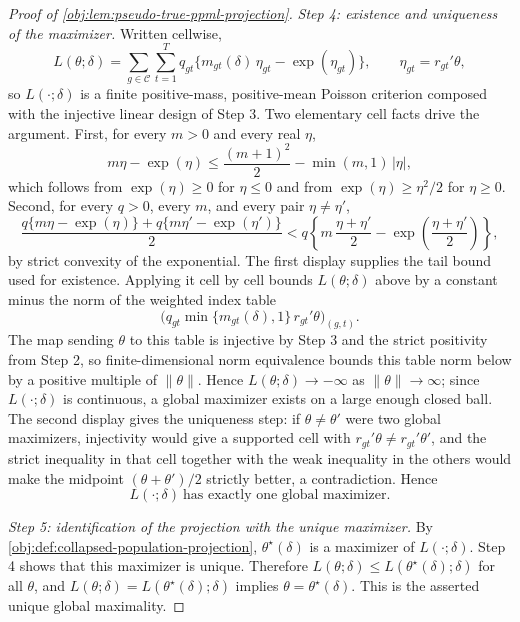 \begin{proof}[Proof of \cref{obj:lem:pseudo-true-ppml-projection}]
\textit{Step 4: existence and uniqueness of the maximizer.} Written cellwise,
\[
L(\theta;\delta)
=
\sum_{g\in\mathcal C}\sum_{t=1}^T
q_{gt}\bigl\{m_{gt}(\delta)\,\eta_{gt}-\exp(\eta_{gt})\bigr\},
\qquad
\eta_{gt}=r_{gt}'\theta ,
\]
so \(L(\cdot;\delta)\) is a finite positive-mass, positive-mean Poisson criterion composed with the injective linear design of Step 3.
Two elementary cell facts drive the argument. First, for every \(m>0\) and every real \(\eta\),
\[
m\eta-\exp(\eta)
\le
\frac{(m+1)^2}{2}-\min(m,1)\,|\eta| ,
\]
which follows from \(\exp(\eta)\ge0\) for \(\eta\le0\) and from \(\exp(\eta)\ge \eta^2/2\) for \(\eta\ge0\).
Second, for every \(q>0\), every \(m\), and every pair \(\eta\neq\eta'\),
\[
\frac{q\{m\eta-\exp(\eta)\}+q\{m\eta'-\exp(\eta')\}}{2}
<
q\left\{m\,\frac{\eta+\eta'}{2}-\exp\!\left(\frac{\eta+\eta'}{2}\right)\right\},
\]
by strict convexity of the exponential.
The first display supplies the tail bound used for existence. Applying it cell by cell bounds \(L(\theta;\delta)\) above by a constant minus the norm of the weighted index table
\[
\bigl(q_{gt}\min\{m_{gt}(\delta),1\}\,r_{gt}'\theta\bigr)_{(g,t)}.
\]
The map sending \(\theta\) to this table is injective by Step 3 and the strict positivity from Step 2, so finite-dimensional norm equivalence bounds this table norm below by a positive multiple of \(\|\theta\|\). Hence \(L(\theta;\delta)\to-\infty\) as \(\|\theta\|\to\infty\); since \(L(\cdot;\delta)\) is continuous, a global maximizer exists on a large enough closed ball. The second display gives the uniqueness step: if \(\theta\neq\theta'\) were two global maximizers, injectivity would give a supported cell with \(r_{gt}'\theta\neq r_{gt}'\theta'\), and the strict inequality in that cell together with the weak inequality in the others would make the midpoint \((\theta+\theta')/2\) strictly better, a contradiction. Hence
\[
L(\cdot;\delta)\ \text{has exactly one global maximizer.}
\]

\textit{Step 5: identification of the projection with the unique maximizer.} By \cref{obj:def:collapsed-population-projection}, \(\theta^\star(\delta)\) is a maximizer of \(L(\cdot;\delta)\). Step 4 shows that this maximizer is unique. Therefore \(L(\theta;\delta)\le L(\theta^\star(\delta);\delta)\) for all \(\theta\), and \(L(\theta;\delta)=L(\theta^\star(\delta);\delta)\) implies \(\theta=\theta^\star(\delta)\). This is the asserted unique global maximality.


\end{proof}

